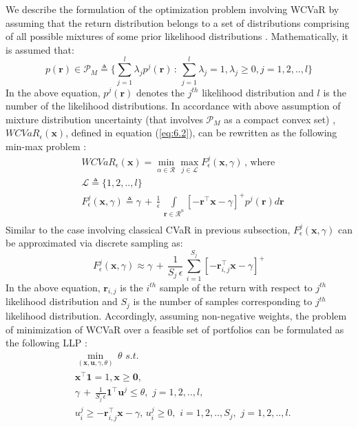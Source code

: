 \documentclass[12pt]{article}
\numberwithin{equation}{section}
\begin{document}
We describe the formulation of the optimization problem involving WCVaR by assuming that the return distribution belongs to a set of distributions comprising of all possible mixtures of some prior likelihood distributions \cite{zhu}. Mathematically, it is assumed that:
\begin{equation}
\label{eq:6.8}
p(\mathbf{r}) \in \mathcal{P}_{M} \triangleq \bigg\{ \sum_{j=1}^{l} \lambda_{j}p^{j}(\mathbf{r}) \, : \, \sum_{j=1}^{l}\lambda_{j}=1, \lambda_{j} \geq 0,j=1,2,..,l \bigg\}
\end{equation}
In the above equation, $p^{j}(\mathbf{r})$ denotes the $j^{th}$ likelihood distribution and $l$ is the number of the likelihood distributions. In accordance with above assumption of mixture distribution uncertainty (that involves $\mathcal{P}_{M}$ as a compact convex set) , $WCVaR_{\epsilon}(\mathbf{x})$, defined in equation (\ref{eq:6.2}), can be rewritten as the following min-max problem \cite{zhu}: 
\begin{equation}
\label{eq:6.9}
\begin{split}
& WCVaR_{\epsilon}(\mathbf{x}) = \min_{\alpha \in \mathcal{R}} \max_{j \in \mathcal{L} } F_{\epsilon}^{j}(\mathbf{x},\gamma) \, , \, \text{where} \\
& \mathcal{L} \triangleq \{ 1,2,..,l \} \\
& F_{\epsilon}^{j}(\mathbf{x},\gamma) \triangleq \gamma \, + \, \frac{1}{\epsilon} \, \int \limits_{\mathbf{r} \in \mathcal{R}^{n}} [-\mathbf{r}^{\top}\mathbf{x}-\gamma]^{+} p^{j}(\mathbf{r})  d\mathbf{r} \\
\end{split}
\end{equation}
Similar to the case involving classical CVaR in previous subsection, $F_{\epsilon}^{j}(\mathbf{x},\gamma)$ can be approximated via discrete sampling as:
\begin{equation}
\label{eq:6.10}
F_{\epsilon}^{j}(\mathbf{x},\gamma) \approx \gamma \, + \, \frac{1}{S_{j} \, \epsilon} \, \sum_{i=1}^{S_{j}} [-\mathbf{r}_{i,j}^{\top}\mathbf{x}-\gamma]^{+}
\end{equation}
In the above equation, $\mathbf{r}_{i,j}$ is the $i^{th}$ sample of the return with respect to $j^{th}$ likelihood distribution and $S_{j}$ is the number of samples corresponding to $j^{th}$ likelihood distribution. Accordingly, assuming non-negative weights, the problem of minimization of WCVaR over a feasible set of portfolios can be formulated as the following LLP \cite{zhu}:
\begin{equation}
\label{eq:6.11}
\begin{split}
& \min_{(\mathbf{x},\mathbf{u},\gamma,\theta)} \, \theta \, \, s.t. \\
& \mathbf{x}^{\top}\mathbf{1}=1, \mathbf{x} \geq \mathbf{0}, \\
& \gamma \, + \, \frac{1}{S_{j} \, \epsilon} \mathbf{1}^{\top}\mathbf{u}^{j} \leq \theta, \, \, j=1,2,..,l,\\
& u_{i}^{j} \geq -\mathbf{r}_{i,j}^{\top}\mathbf{x}-\gamma, \, u_{i}^{j} \geq 0, \, \, i=1,2,..,S_{j}, \, \, j=1,2,..,l. \\
\end{split}
\end{equation}
\end{document}

